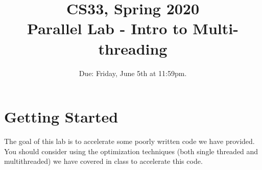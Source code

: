 \documentclass[11pt]{article}
\begin{document}
\title{CS33, Spring 2020\\
Parallel Lab - Intro to Multi-threading\\
}

\author{}%
\date{Due: Friday, June 5th at 11:59pm. }

\maketitle

\section{Getting Started}
The goal of this lab is to accelerate some poorly written code we have provided. You should consider using the optimization techniques (both single threaded and multithreaded) we have covered in class to accelerate this code.
\end{document}
